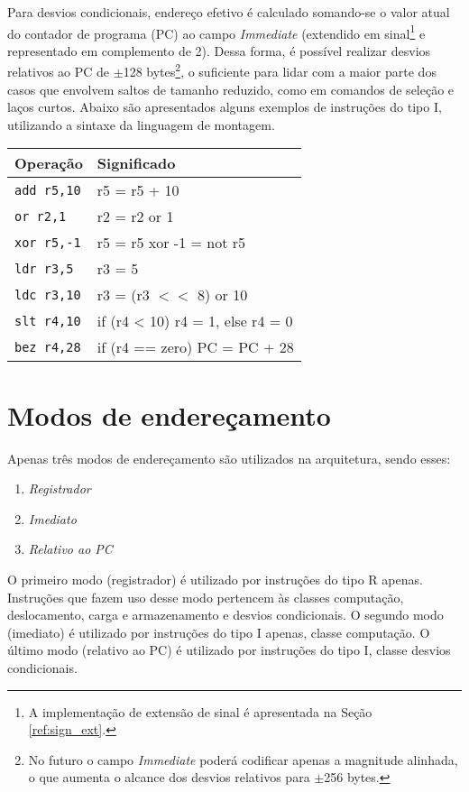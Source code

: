 \documentclass{extreport}
\begin{document}
Para desvios condicionais, endereço efetivo é calculado somando-se o valor atual do contador de programa (PC) ao campo \textit{Immediate} (extendido em sinal\footnote{A implementação de extensão de sinal é apresentada na Seção \ref{ref:sign_ext}.} e representado em complemento de 2). Dessa forma, é possível realizar desvios relativos ao PC de $\pm$128 bytes\footnote{No futuro o campo \textit{Immediate} poderá codificar apenas a magnitude alinhada, o que aumenta o alcance dos desvios relativos para $\pm$256 bytes.}, o suficiente para lidar com a maior parte dos casos que envolvem saltos de tamanho reduzido, como em comandos de seleção e laços curtos. Abaixo são apresentados alguns exemplos de instruções do tipo I, utilizando a sintaxe da linguagem de montagem.

\begin{table}[ht!]
\centering
\begin{tabular}{|p{3.0cm}|p{6.0cm}|}
\hline
\bf{Operação} & \bf{Significado} \\ \hline \hline
\texttt{add r5,10} & r5 = r5 + 10 \\ \hline
\texttt{or r2,1} & r2 = r2 or 1 \\ \hline
\texttt{xor r5,-1} & r5 = r5 xor -1 = not r5 \\ \hline
\texttt{ldr r3,5} & r3 = 5 \\ \hline
\texttt{ldc r3,10} & r3 = (r3 $<<$ 8) or 10 \\ \hline
\texttt{slt r4,10} & if (r4 < 10) r4 = 1, else r4 = 0 \\ \hline
\texttt{bez r4,28} & if (r4 == zero) PC = PC + 28 \\ \hline
\end{tabular}
\end{table}

\section{Modos de endereçamento}

Apenas três modos de endereçamento são utilizados na arquitetura, sendo esses:

\begin{enumerate}
\item \textit{Registrador}
\item \textit{Imediato}
\item \textit{Relativo ao PC}
\end{enumerate}

O primeiro modo (registrador) é utilizado por instruções do tipo R apenas. Instruções que fazem uso desse modo pertencem às classes computação, deslocamento, carga e armazenamento e desvios condicionais. O segundo modo (imediato) é utilizado por instruções do tipo I apenas, classe computação. O último modo (relativo ao PC) é utilizado por instruções do tipo I, classe desvios condicionais.
\end{document}
